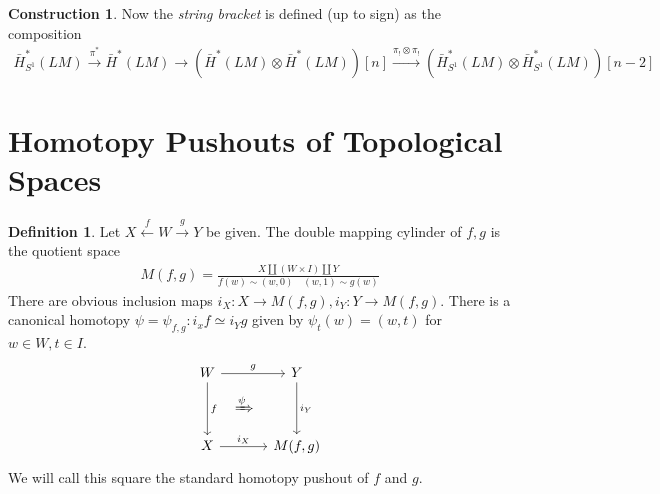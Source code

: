 \documentclass{scrartcl}
\theoremstyle{plain}
\theoremstyle{definition}
\newtheorem{definition}[theorem]{Definition}
\newtheorem{construction}[theorem]{Construction}
\let\xto\xrightarrow
\renewcommand{\coprod}{\mathbin{\amalg}}
\begin{document}
\begin{construction}
    Now the \emph{string bracket} is defined (up to sign) as the composition
\begin{align*}
    \bar H_{S^1}^*(LM) \xto{\pi^*} \bar H^*(LM)\to (\bar H^*(LM) \otimes \bar H^*(LM))[n] \xto{\pi_!\otimes\pi_!} (\bar H^*_{S^1}(LM)\otimes\bar H^*_{S^1}(LM))[n-2]
\end{align*}
\end{construction}











\section{Homotopy Pushouts of Topological Spaces}

\begin{definition}
    Let $X\xleftarrow{f}W\xrightarrow{g}Y$ be given. The double mapping cylinder of $f, g$ is the quotient space
    \begin{align*}
        M(f, g) = \frac{X\coprod(W\times I)\coprod Y}{f(w)\sim (w,0)\quad (w, 1)\sim g(w)}
    \end{align*}
    There are obvious inclusion maps $i_X\colon X\to M(f, g), i_Y\colon Y\to M(f, g)$. There is a canonical homotopy $\psi=\psi_{f, g}\colon i_xf\simeq i_Yg$ given by $\psi_t(w) = (w, t)$ for $w\in W, t\in I$. 
    \begin{equation}
        \begin{tikzcd}[column sep=.2cm, row sep=.2cm]
            W \arrow[rr,"g"]\arrow[dd,"f"] && Y \arrow[dd, "i_Y"] \\
            & \xRightarrow{\psi} & \\
            X \arrow[rr, "i_X"] && M(f, g)
        \end{tikzcd}
    \end{equation}
    We will call this square the standard homotopy pushout of $f$ and $g$.
\end{definition}
\end{document}

